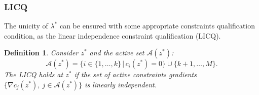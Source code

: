 \documentclass{beamer}
\newtheorem{defi}{Definition}
\begin{document}
\begin{frame}
\frametitle{LICQ}





The unicity of $\lambda^*$ can be ensured with some appropriate constraints qualification condition, as the  linear independence constraint qualification (LICQ).




\mbox{}

\begin{defi}
Consider $z^*$ and the active set $\mathcal{A}(z^*)$:
\[
\mathcal{A}(z^*) = \lbrace i \in \lbrace 1,\ldots,k \rbrace \, | \,
c_i(z^*) = 0 \rbrace \cup \lbrace k+1,\ldots,M \rbrace.
\]
The LICQ holds at $z^*$ if the set of active constraints gradients $\lbrace \nabla c_j(z^*),\ j \in \mathcal{A}(z^*) \rbrace$ is linearly independent.
\end{defi}

\end{frame}
\end{document}
